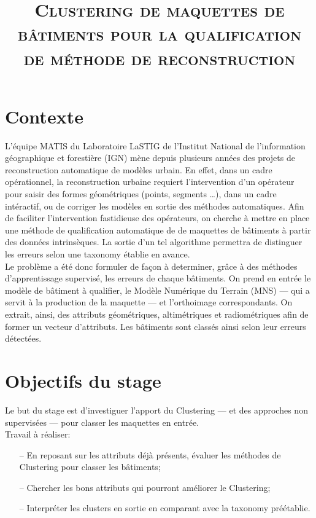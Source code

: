 \documentclass[a4paper,11pt]{article}
\title{\Large \textsc{Clustering de maquettes de bâtiments pour la qualification de méthode de reconstruction}}
\date{}
\begin{document}
    \maketitle

    \section*{Contexte}

    L'équipe MATIS du Laboratoire LaSTIG de l'Institut National de l'information géographique et forestière (IGN) mène depuis plusieurs années des projets de reconstruction automatique de modèles urbain. En effet, dans un cadre opérationnel, la reconstruction urbaine requiert l'intervention d'un opérateur pour saisir des formes géométriques (points, segments \dots), dans un cadre intéractif, ou de corriger les modèles en sortie des méthodes automatiques. Afin de faciliter l'intervention fastidieuse des opérateurs, on cherche à mettre en place une méthode de qualification automatique de de maquettes de bâtiments à partir des données intrinsèques. La sortie d'un tel algorithme permettra de distinguer les erreurs selon une taxonomy établie en avance.\\

    Le problème a été donc formuler de façon à determiner, grâce à des méthodes d'apprentissage supervisé, les erreurs de chaque bâtiments. On prend en entrée le modèle de bâtiment à qualifier, le Modèle Numérique du Terrain (MNS) --- qui a servit à la production de la maquette --- et l'orthoimage correspondants. On extrait, ainsi, des attributs géométriques, altimétriques et radiométriques afin de former un vecteur d'attributs. Les bâtiments sont classés ainsi selon leur erreurs détectées.\\

    \section*{Objectifs du stage}

    Le but du stage est d'investiguer l'apport du Clustering --- et des approches non supervisées --- pour classer les maquettes en entrée.\\

    Travail à réaliser:
    \begin{itemize}
        \item[--] En reposant sur les attributs déjà présents, évaluer les méthodes de Clustering pour classer les bâtiments;
        \item[--] Chercher les bons attributs qui pourront améliorer le Clustering;
        \item[--] Interpréter les clusters en sortie en comparant avec la taxonomy préétablie.
    \end{itemize}
\end{document}
